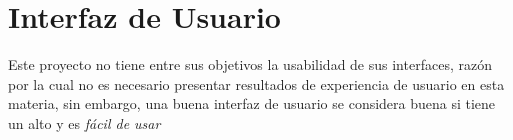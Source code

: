 \section{Interfaz de Usuario}

Este proyecto no tiene entre sus objetivos la usabilidad de sus interfaces, razón por la cual no es necesario presentar resultados de experiencia de usuario en esta materia, sin embargo, una buena interfaz de usuario se considera buena si tiene un alto \conversionRateCOM y es \textit{fácil de usar} \cite{online_goodgui_org}


